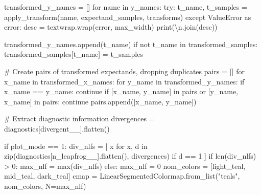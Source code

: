 \documentclass[
  letterpaper,
  DIV=11,
  numbers=noendperiod]{scrartcl}
\newenvironment{Shaded}{\begin{snugshade}}{\end{snugshade}}
\newcommand{\BuiltInTok}[1]{\textcolor[rgb]{0.00,0.23,0.31}{#1}}
\newcommand{\CharTok}[1]{\textcolor[rgb]{0.13,0.47,0.30}{#1}}
\newcommand{\CommentTok}[1]{\textcolor[rgb]{0.37,0.37,0.37}{#1}}
\newcommand{\ControlFlowTok}[1]{\textcolor[rgb]{0.00,0.23,0.31}{#1}}
\newcommand{\DecValTok}[1]{\textcolor[rgb]{0.68,0.00,0.00}{#1}}
\newcommand{\ImportTok}[1]{\textcolor[rgb]{0.00,0.46,0.62}{#1}}
\newcommand{\KeywordTok}[1]{\textcolor[rgb]{0.00,0.23,0.31}{#1}}
\newcommand{\NormalTok}[1]{\textcolor[rgb]{0.00,0.23,0.31}{#1}}
\newcommand{\OperatorTok}[1]{\textcolor[rgb]{0.37,0.37,0.37}{#1}}
\newcommand{\PreprocessorTok}[1]{\textcolor[rgb]{0.68,0.00,0.00}{#1}}
\newcommand{\StringTok}[1]{\textcolor[rgb]{0.13,0.47,0.30}{#1}}
\begin{document}
\begin{Shaded}
\begin{Highlighting}[]
\NormalTok{  transformed\_y\_names }\OperatorTok{=}\NormalTok{ []}
  \ControlFlowTok{for}\NormalTok{ name }\KeywordTok{in}\NormalTok{ y\_names:}
    \ControlFlowTok{try}\NormalTok{: }
\NormalTok{      t\_name, t\_samples }\OperatorTok{=}\NormalTok{ apply\_transform(name, }
\NormalTok{                                          expectand\_samples, }
\NormalTok{                                          transforms)}
    \ControlFlowTok{except} \PreprocessorTok{ValueError} \ImportTok{as}\NormalTok{ error:}
\NormalTok{      desc }\OperatorTok{=}\NormalTok{ textwrap.wrap(error, max\_width)}
      \BuiltInTok{print}\NormalTok{(}\StringTok{\textquotesingle{}}\CharTok{\textbackslash{}n}\StringTok{\textquotesingle{}}\NormalTok{.join(desc))}
    
\NormalTok{    transformed\_y\_names.append(t\_name)}
    \ControlFlowTok{if} \KeywordTok{not}\NormalTok{ t\_name }\KeywordTok{in}\NormalTok{ transformed\_samples:}
\NormalTok{      transformed\_samples[t\_name] }\OperatorTok{=}\NormalTok{ t\_samples}
      
  \CommentTok{\# Create pairs of transformed expectands, dropping duplicates}
\NormalTok{  pairs }\OperatorTok{=}\NormalTok{ []}
  \ControlFlowTok{for}\NormalTok{ x\_name }\KeywordTok{in}\NormalTok{ transformed\_x\_names:}
    \ControlFlowTok{for}\NormalTok{ y\_name }\KeywordTok{in}\NormalTok{ transformed\_y\_names:}
      \ControlFlowTok{if}\NormalTok{ x\_name }\OperatorTok{==}\NormalTok{ y\_name: }
        \ControlFlowTok{continue}
      \ControlFlowTok{if}\NormalTok{ [x\_name, y\_name] }\KeywordTok{in}\NormalTok{ pairs }\KeywordTok{or}\NormalTok{ [y\_name, x\_name] }\KeywordTok{in}\NormalTok{ pairs: }
        \ControlFlowTok{continue}
\NormalTok{      pairs.append([x\_name, y\_name])}
  
  \CommentTok{\# Extract diagnostic information}
\NormalTok{  divergences }\OperatorTok{=}\NormalTok{ diagnostics[}\StringTok{\textquotesingle{}divergent\_\_\textquotesingle{}}\NormalTok{].flatten()}
  
  \ControlFlowTok{if}\NormalTok{ plot\_mode }\OperatorTok{==} \DecValTok{1}\NormalTok{:}
\NormalTok{    div\_nlfs }\OperatorTok{=}\NormalTok{ [ x }\ControlFlowTok{for}\NormalTok{ x, d }\KeywordTok{in} 
                 \BuiltInTok{zip}\NormalTok{(diagnostics[}\StringTok{\textquotesingle{}n\_leapfrog\_\_\textquotesingle{}}\NormalTok{].flatten(), divergences)}
                 \ControlFlowTok{if}\NormalTok{ d }\OperatorTok{==} \DecValTok{1}\NormalTok{  ]}
    \ControlFlowTok{if} \BuiltInTok{len}\NormalTok{(div\_nlfs) }\OperatorTok{\textgreater{}} \DecValTok{0}\NormalTok{:}
\NormalTok{      max\_nlf }\OperatorTok{=} \BuiltInTok{max}\NormalTok{(div\_nlfs)}
    \ControlFlowTok{else}\NormalTok{:}
\NormalTok{      max\_nlf }\OperatorTok{=} \DecValTok{0}
\NormalTok{    nom\_colors }\OperatorTok{=}\NormalTok{ [light\_teal, mid\_teal, dark\_teal]}
\NormalTok{    cmap }\OperatorTok{=}\NormalTok{ LinearSegmentedColormap.from\_list(}\StringTok{"teals"}\NormalTok{, nom\_colors, }
\NormalTok{                                                      N}\OperatorTok{=}\NormalTok{max\_nlf)}
  

\end{Highlighting}
\end{Shaded}
\end{document}
